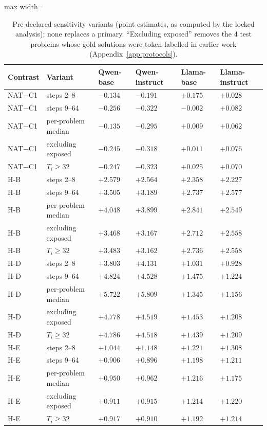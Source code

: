 \begin{table}[!htbp]
\centering\scriptsize
\begin{adjustbox}{max width=\linewidth}\begin{tabular}{@{}l l l l l l@{}}
\toprule
Contrast & Variant & Qwen-base & Qwen-instruct & Llama-base & Llama-instruct \\
\midrule
NAT$-$C1 & steps 2--8 & $-0.134$ & $-0.191$ & $+0.175$ & $+0.028$ \\
NAT$-$C1 & steps 9--64 & $-0.256$ & $-0.322$ & $-0.002$ & $+0.082$ \\
NAT$-$C1 & per-problem median & $-0.135$ & $-0.295$ & $+0.009$ & $+0.062$ \\
NAT$-$C1 & excluding exposed & $-0.245$ & $-0.318$ & $+0.011$ & $+0.076$ \\
NAT$-$C1 & $T_i\ge32$ & $-0.247$ & $-0.323$ & $+0.025$ & $+0.070$ \\
\midrule
H-B & steps 2--8 & $+2.579$ & $+2.564$ & $+2.358$ & $+2.227$ \\
H-B & steps 9--64 & $+3.505$ & $+3.189$ & $+2.737$ & $+2.577$ \\
H-B & per-problem median & $+4.048$ & $+3.899$ & $+2.841$ & $+2.549$ \\
H-B & excluding exposed & $+3.468$ & $+3.167$ & $+2.712$ & $+2.558$ \\
H-B & $T_i\ge32$ & $+3.483$ & $+3.162$ & $+2.736$ & $+2.558$ \\
\midrule
H-D & steps 2--8 & $+3.803$ & $+4.131$ & $+1.031$ & $+0.928$ \\
H-D & steps 9--64 & $+4.824$ & $+4.528$ & $+1.475$ & $+1.224$ \\
H-D & per-problem median & $+5.722$ & $+5.809$ & $+1.345$ & $+1.156$ \\
H-D & excluding exposed & $+4.778$ & $+4.519$ & $+1.453$ & $+1.208$ \\
H-D & $T_i\ge32$ & $+4.786$ & $+4.518$ & $+1.439$ & $+1.209$ \\
\midrule
H-E & steps 2--8 & $+1.044$ & $+1.148$ & $+1.221$ & $+1.308$ \\
H-E & steps 9--64 & $+0.906$ & $+0.896$ & $+1.198$ & $+1.211$ \\
H-E & per-problem median & $+0.950$ & $+0.962$ & $+1.216$ & $+1.175$ \\
H-E & excluding exposed & $+0.911$ & $+0.915$ & $+1.214$ & $+1.220$ \\
H-E & $T_i\ge32$ & $+0.917$ & $+0.910$ & $+1.192$ & $+1.214$ \\
\bottomrule
\end{tabular}\end{adjustbox}
\caption{Pre-declared sensitivity variants \tagE{} (point estimates, as computed by the locked analysis); none replaces a primary. ``Excluding exposed'' removes the 4 test problems whose gold solutions were token-labelled in earlier work (Appendix~\ref{app:protocols}).}
\label{tab:sensv3}
\end{table}
